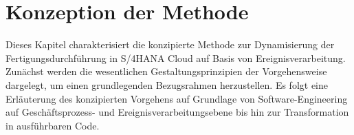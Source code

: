 \chapter{Konzeption der Methode}\label{ch:Methode}
Dieses Kapitel charakterisiert die konzipierte Methode zur Dynamisierung der Fertigungsdurchführung in S/4HANA Cloud auf Basis von Ereignisverarbeitung.
Zunächst werden die wesentlichen Gestaltungsprinzipien der Vorgehensweise dargelegt, um einen grundlegenden Bezugsrahmen herzustellen.
Es folgt eine Erläuterung des konzipierten Vorgehens auf Grundlage von Software-Engineering auf Geschäftsprozess- und Ereignisverarbeitungsebene bis hin zur Transformation in ausführbaren Code.

